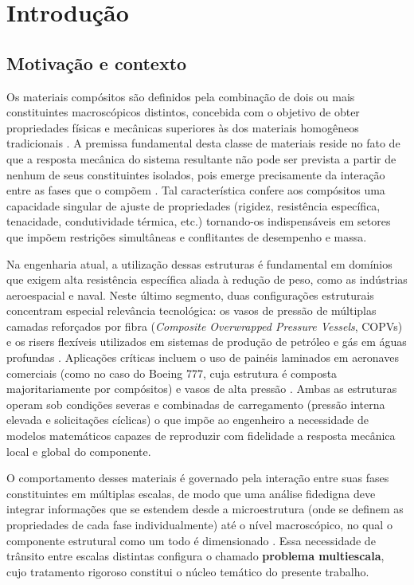 \chapter{Introdução}


\section{Motivação e contexto}

Os materiais compósitos são definidos pela combinação de dois ou mais constituintes macroscópicos distintos, concebida com o objetivo de obter propriedades físicas e mecânicas superiores às dos materiais homogêneos tradicionais \cite{RMJones2018}. A premissa fundamental desta classe de
materiais reside no fato de que a resposta mecânica do sistema resultante não pode ser prevista a partir de nenhum de seus constituintes isolados, pois emerge precisamente da interação entre as fases que o compõem \cite{PartonReport}. Tal característica confere aos compósitos uma capacidade singular de ajuste de propriedades  (rigidez, resistência específica, tenacidade, condutividade térmica, etc.) tornando-os indispensáveis em setores que impõem restrições simultâneas e conflitantes de desempenho e massa.

Na engenharia atual, a utilização dessas estruturas é fundamental em domínios que exigem alta resistência específica aliada à redução de peso, como as indústrias aeroespacial e naval. Neste último segmento, duas configurações estruturais concentram especial relevância tecnológica: os vasos de pressão de múltiplas camadas reforçados por fibra (\textit{Composite Overwrapped Pressure Vessels}, COPVs) \cite[p.~1]{Zhang2022} e os risers flexíveis utilizados em sistemas de produção de petróleo e gás em águas profundas \cite{Liu2026}. Aplicações críticas incluem o uso de painéis laminados em aeronaves comerciais (como no caso do Boeing 777, cuja estrutura é composta majoritariamente por compósitos) e vasos de alta pressão \cite[p.~2]{Zhang2022}. Ambas as estruturas operam sob condições severas e combinadas de carregamento (pressão interna elevada e solicitações cíclicas) o que impõe ao engenheiro a necessidade de modelos matemáticos capazes de reproduzir com fidelidade a resposta mecânica local e global do componente.

O comportamento desses materiais é governado pela interação entre suas
fases constituintes em múltiplas escalas, de modo que uma análise fidedigna deve integrar informações que se estendem desde a microestrutura  (onde se definem as propriedades de cada fase individualmente)  até o nível macroscópico, no qual o componente estrutural como um todo é dimensionado \cite{PartonReport}. Essa necessidade de trânsito entre escalas distintas configura o chamado \textbf{problema multiescala}, cujo tratamento rigoroso constitui o núcleo temático do presente trabalho.

